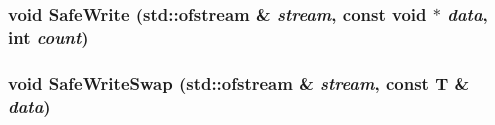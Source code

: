 \label{disk__image_8hh_ae71db8488b0a70f2e3b31ee29f45caf8}
\hypertarget{disk__image_8hh_a34c4ee1ddfb0f2ef17e6d2275999f7d1}{
\subsubsection[{SafeWrite}]{\setlength{\rightskip}{0pt plus 5cm}void SafeWrite (std::ofstream \& {\em stream}, \/  const void $\ast$ {\em data}, \/  int {\em count})}}
\label{disk__image_8hh_a34c4ee1ddfb0f2ef17e6d2275999f7d1}
\hypertarget{disk__image_8hh_a2c4a168c945c58afd3c1bbd6925f1aa0}{
\subsubsection[{SafeWriteSwap}]{\setlength{\rightskip}{0pt plus 5cm}void SafeWriteSwap (std::ofstream \& {\em stream}, \/  const T \& {\em data})}}
\label{disk__image_8hh_a2c4a168c945c58afd3c1bbd6925f1aa0}
